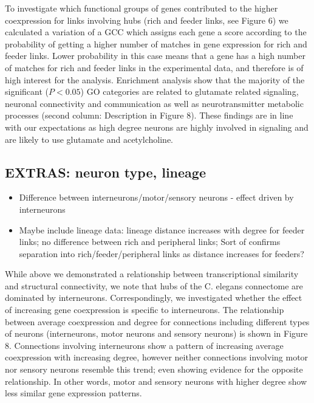 \documentclass[10pt,letterpaper]{article}
\begin{document}
To investigate which functional groups of genes contributed to the higher coexpression for links involving hubs (rich and feeder links, see Figure 6) we calculated a variation of a GCC which assigns each gene a score according to the probability of getting a higher number of matches in gene expression for rich and feeder links.
Lower probability in this case means that a gene has a high number of matches for rich and feeder links in the experimental data, and therefore is of high interest for the analysis.
Enrichment analysis show that the majority of the significant ($P < 0.05$) GO categories are related to glutamate related signaling, neuronal connectivity and communication as well as neurotransmitter metabolic processes (second column: Description in Figure 8).
These findings are in line with our expectations as high degree neurons are highly involved in signaling and are likely to use glutamate and acetylcholine.

\subsection*{EXTRAS: neuron type, lineage}
\begin{itemize}
    \item{Difference between interneurons/motor/sensory neurons - effect driven by interneurons}
    \item{Maybe include lineage data: lineage distance increases with degree for feeder links; no difference between rich and peripheral links; Sort of confirms separation into rich/feeder/peripheral links as distance increases for feeders?}
\end{itemize} 

While above we demonstrated a relationship between transcriptional similarity and structural connectivity, we note that hubs of the C. elegans connectome are dominated by interneurons.
Correspondingly, we investigated whether the effect of increasing gene coexpression is specific to interneurons.
The relationship between average coexpression and degree for connections including different types of neurons (interneurons, motor neurons and sensory neurons) is shown in Figure 8.
Connections involving interneurons show a pattern of increasing average coexpression with increasing degree, however neither connections involving motor nor sensory neurons resemble this trend; even showing evidence for the opposite relationship.
In other words, motor and sensory neurons with higher degree show less similar gene expression patterns.
\end{document}
